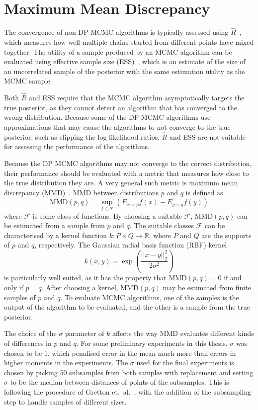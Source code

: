 \documentclass[english,twoside,openright]{HYgraduMLDS}
\newcommand{\R}{\mathbb{R}}
\begin{document}
\section{Maximum Mean Discrepancy}\label{mmd_section}

The convergence of non-DP MCMC algorithms is typically assessed using 
\(\hat{R}\)~\cite{BDA}, which measures how well multiple chains started from 
different points have mixed together. The utility of a sample produced by an 
MCMC algorithm can be evaluated using effective sample size (ESS)~\cite{BDA},
which is an estimate of the size of an uncorrelated sample of the posterior
with the same estimation utility as the MCMC sample. 

Both \(\hat{R}\) and ESS require that the MCMC algorithm asymptotically targets 
the true posterior, as they cannot detect an algorithm that has converged to the 
wrong distribution. Because some of the DP MCMC algorithms use approximations 
that may cause the algorithms to not converge to the true posterior, 
such as clipping the log likelihood ratios, \(\hat{R}\) and ESS are not suitable 
for assessing the performance of the algorithms.

Because the DP MCMC algorithms may not converge to the correct distribution, 
their performance should be evaluated with a metric that measures how close 
to the true distribution they are. A very general such metric is maximum mean
discrepancy (MMD)~\cite{GrettonBRSS12}. MMD between distributions \(p\) and \(q\) 
is defined as 
\[
    \mathrm{MMD}(p, q) = \sup_{f\in \mathcal{F}}(E_{x\sim p}f(x) - E_{y\sim q}f(y))
\]
where \(\mathcal{F}\) is some class of functions. By 
choosing a suitable \(\mathcal{F}\), \(\mathrm{MMD}(p, q)\) can be estimated from a 
sample from \(p\) and \(q\). The suitable classes \(\mathcal{F}\) can be 
characterised by a kernel function \(k\colon P\times Q \to \R\), where 
\(P\) and \(Q\) are the supports of \(p\) and \(q\), respectively.
The Gaussian radial basis function (RBF) kernel 
\[
    k(x, y) = \exp\left(\frac{||x - y||_2^2}{2\sigma^2}\right)
\]
is particularly well suited, as it has the property that 
\(\mathrm{MMD}(p, q) = 0\) if and only if \(p = q\). After choosing a kernel,
\(\mathrm{MMD}(p, q)\) may be estimated from finite samples of \(p\) and \(q\).
To evaluate MCMC algorithms, one of the samples is the output of the algorithm 
to be evaluated, and the other is a sample from the true posterior.

The choice of the \(\sigma\) parameter of \(k\) affects the way MMD evaluates 
different kinds of differences in \(p\) and \(q\). For some preliminary experiments
in this thesis, \(\sigma\) was chosen to be 1, which penalised error in the 
mean much more than errors in higher moments in the experiments. 
The \(\sigma\) used for the final experiments is chosen by picking 50 subsamples
from both samples with replacement and setting \(\sigma\) to be the median 
between distances of points of the subsamples. This is following the procedure of 
Gretton et.\ al.~\cite{GrettonBRSS12}, with the addition of the subsampling step 
to handle samples of different sizes.
\end{document}
